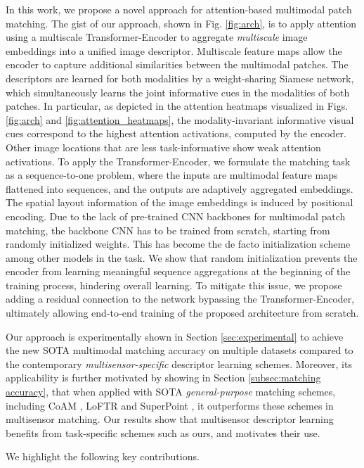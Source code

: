 \documentclass[10pt,journal]{IEEEtran}\usepackage{amsfonts}
\begin{document}
In this work, we propose a novel approach for attention-based multimodal
patch matching. The gist of our approach, shown in Fig. \ref{fig:arch}, is
to apply attention using a multiscale Transformer-Encoder to aggregate \emph{multiscale} image embeddings into a unified image descriptor. Multiscale
feature maps allow the encoder to capture additional similarities between
the multimodal patches. The descriptors are learned for both modalities by a
weight-sharing Siamese network, which simultaneously learns the joint
informative cues in the modalities of both patches. In particular, as
depicted in the attention heatmaps visualized in Figs. \ref{fig:arch} and \ref{fig:attention_heatmaps}, the modality-invariant informative visual cues
correspond to the highest attention activations, computed by the encoder.
Other image locations that are less task-informative show weak attention
activations. To apply the Transformer-Encoder, we formulate the matching
task as a sequence-to-one problem, where the inputs are multimodal feature
maps flattened into sequences, and the outputs are adaptively aggregated
embeddings. The spatial layout information of the image embeddings is
induced by positional encoding. Due to the lack of pre-trained CNN backbones
for multimodal patch matching, the backbone CNN has to be trained from
scratch, starting from randomly initialized weights. This has become the de
facto initialization scheme among other models in the task. We show that
random initialization prevents the encoder from learning meaningful sequence
aggregations at the beginning of the training process, hindering overall
learning. To mitigate this issue, we propose adding a residual connection to
the network bypassing the Transformer-Encoder, ultimately allowing
end-to-end training of the proposed architecture from scratch.

Our approach is experimentally shown in Section \ref{sec:experimental} to
achieve the new SOTA multimodal matching accuracy on multiple datasets
compared to the contemporary \textit{multisensor-specific} descriptor
learning schemes. Moreover, its applicability is further motivated by
showing in Section \ref{subsec:matching accuracy}, that when applied with
SOTA \textit{general-purpose} matching schemes, including CoAM \cite{CoAM},
LoFTR \cite{LoFTR} and SuperPoint \cite{SuperPoint}, it outperforms these
schemes in multisensor matching. Our results show that multisensor
descriptor learning benefits from task-specific schemes such as ours, and
motivates their use.

We highlight the following key contributions.
\end{document}
